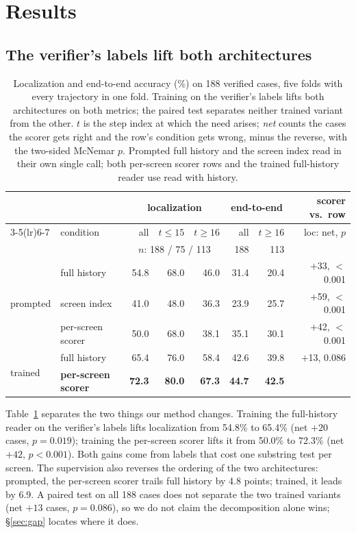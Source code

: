 \section{Results}

\subsection{The verifier's labels lift both architectures}
\label{sec:main}
\begin{table}[t]
\centering\scriptsize
\caption{Localization and end-to-end accuracy (\%) on 188 verified cases, five folds with every trajectory in one fold. Training on the verifier's labels lifts both architectures on both metrics; the paired test separates neither trained variant from the other. $t$ is the step index at which the need arises; \emph{net} counts the cases the scorer gets right and the row's condition gets wrong, minus the reverse, with the two-sided McNemar $p$. Prompted full history and the screen index read in their own single call; both per-screen scorer rows and the trained full-history reader use read with history.}
\label{tab:main}
\begin{tabular}{llrrrrrr}
\toprule
 & & \multicolumn{3}{c}{localization} & \multicolumn{2}{c}{end-to-end} & scorer vs.\ row \\
\cmidrule(lr){3-5}\cmidrule(lr){6-7}
 & condition & all & $t\le15$ & $t\ge16$ & all & $t\ge16$ & loc: net, $p$ \\
 & & \multicolumn{3}{c}{$n$: 188 / 75 / 113} & 188 & 113 & \\
\midrule
\multirow{3}{*}{prompted} & full history & 54.8 & 68.0 & 46.0 & 31.4 & 20.4 & $+$33, $<$0.001 \\
 & screen index & 41.0 & 48.0 & 36.3 & 23.9 & 25.7 & $+$59, $<$0.001 \\
 & per-screen scorer & 50.0 & 68.0 & 38.1 & 35.1 & 30.1 & $+$42, $<$0.001 \\
\midrule
\multirow{2}{*}{trained} & full history & 65.4 & 76.0 & 58.4 & 42.6 & 39.8 & $+$13, 0.086 \\
 & \textbf{per-screen scorer} & \textbf{72.3} & \textbf{80.0} & \textbf{67.3} & \textbf{44.7} & \textbf{42.5} & \\
\bottomrule
\end{tabular}
\end{table}

Table~\ref{tab:main} separates the two things our method changes. Training the full-history reader on the verifier's labels lifts localization from 54.8\% to 65.4\% (net $+20$ cases, $p=0.019$); training the per-screen scorer lifts it from 50.0\% to 72.3\% (net $+42$, $p<0.001$). Both gains come from labels that cost one substring test per screen. The supervision also reverses the ordering of the two architectures: prompted, the per-screen scorer trails full history by 4.8 points; trained, it leads by 6.9. A paired test on all 188 cases does not separate the two trained variants (net $+13$ cases, $p=0.086$), so we do not claim the decomposition alone wins; \S\ref{sec:gap} locates where it does.

